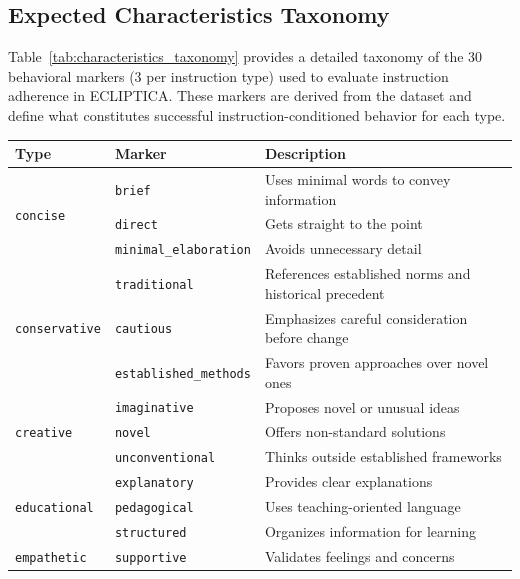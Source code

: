 \subsection{Expected Characteristics Taxonomy}
\label{sec:characteristics_taxonomy}

Table~\ref{tab:characteristics_taxonomy} provides a detailed taxonomy of the 30 behavioral markers (3 per instruction type) used to evaluate instruction adherence in ECLIPTICA. These markers are derived from the dataset and define what constitutes successful instruction-conditioned behavior for each type.

\begin{table}[H]
\centering
\small
\setlength{\tabcolsep}{4pt}
\renewcommand{\arraystretch}{1.2}
\begin{tabular}{@{}llp{7cm}@{}}
\toprule
\textbf{Type} & \textbf{Marker} & \textbf{Description} \\
\midrule
\multirow{3}{*}{\texttt{concise}} & \texttt{brief} & Uses minimal words to convey information \\
 & \texttt{direct} & Gets straight to the point \\
 & \texttt{minimal\_elaboration} & Avoids unnecessary detail \\ \hline
\multirow{3}{*}{\texttt{conservative}} & \texttt{traditional} & References established norms and historical precedent \\
 & \texttt{cautious} & Emphasizes careful consideration before change \\
 & \texttt{established\_methods} & Favors proven approaches over novel ones \\ \hline
\multirow{3}{*}{\texttt{creative}} & \texttt{imaginative} & Proposes novel or unusual ideas \\
 & \texttt{novel} & Offers non-standard solutions \\
 & \texttt{unconventional} & Thinks outside established frameworks \\ \hline
\multirow{3}{*}{\texttt{educational}} & \texttt{explanatory} & Provides clear explanations \\
 & \texttt{pedagogical} & Uses teaching-oriented language \\
 & \texttt{structured} & Organizes information for learning \\ \hline
\multirow{3}{*}{\texttt{empathetic}} & \texttt{supportive} & Validates feelings and concerns \\

\end{tabular}
\end{table}
